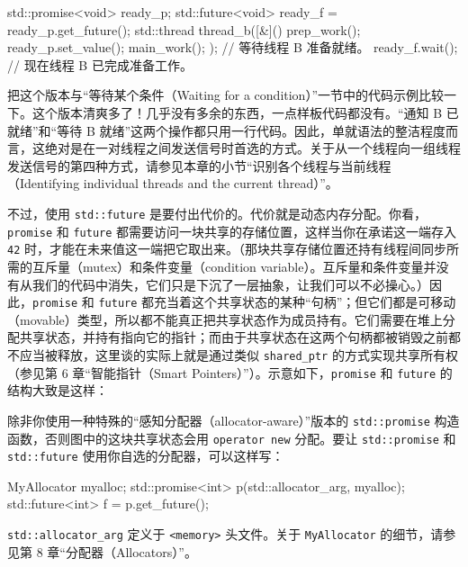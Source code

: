 \begin{codebox}[cpp]
    std::promise<void> ready_p;
    std::future<void> ready_f = ready_p.get_future();
    std::thread thread_b([&]() {
      prep_work();
      ready_p.set_value();
      main_work();
    });
      // 等待线程 B 准备就绪。
    ready_f.wait();
      // 现在线程 B 已完成准备工作。
\end{codebox}

把这个版本与“等待某个条件（Waiting for a condition）”一节中的代码示例比较一下。这个版本清爽多了！几乎没有多余的东西，一点样板代码都没有。“通知 B 已就绪”和“等待 B 就绪”这两个操作都只用一行代码。因此，单就语法的整洁程度而言，这绝对是在一对线程之间发送信号时首选的方式。关于从一个线程向一组线程发送信号的第四种方式，请参见本章的小节“识别各个线程与当前线程（Identifying individual threads and the current thread）”。

不过，使用 \texttt{std::\allowbreak{}future} 是要付出代价的。代价就是动态内存分配。你看，\texttt{promise} 和 \texttt{future} 都需要访问一块共享的存储位置，这样当你在承诺这一端存入 \texttt{42} 时，才能在未来值这一端把它取出来。（那块共享存储位置还持有线程间同步所需的互斥量（mutex）和条件变量（condition variable）。互斥量和条件变量并没有从我们的代码中消失，它们只是下沉了一层抽象，让我们可以不必操心。）因此，\texttt{promise} 和 \texttt{future} 都充当着这个共享状态的某种“句柄”；但它们都是可移动（movable）类型，所以都不能真正把共享状态作为成员持有。它们需要在堆上分配共享状态，并持有指向它的指针；而由于共享状态在这两个句柄都被销毁之前都不应当被释放，这里谈的实际上就是通过类似 \texttt{shared\_\allowbreak{}ptr} 的方式实现共享所有权（参见第 6 章“智能指针（Smart Pointers）”）。示意如下，\texttt{promise} 和 \texttt{future} 的结构大致是这样：


除非你使用一种特殊的“感知分配器（allocator-aware）”版本的 \texttt{std::\allowbreak{}promise} 构造函数，否则图中的这块共享状态会用 \texttt{operator new} 分配。要让 \texttt{std::\allowbreak{}promise} 和 \texttt{std::\allowbreak{}future} 使用你自选的分配器，可以这样写：

\begin{codebox}[cpp]
    MyAllocator myalloc{};
    std::promise<int> p(std::allocator_arg, myalloc);
    std::future<int> f = p.get_future();
\end{codebox}

\texttt{std::\allowbreak{}allocator\_\allowbreak{}arg} 定义于 \texttt{<memory>\allowbreak{}} 头文件。关于 \texttt{My\allowbreak{}Allocator} 的细节，请参见第 8 章“分配器（Allocators）”。


